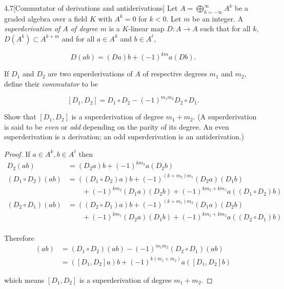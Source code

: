 \begin{problem}{4.7}[Commutator of derivations and antiderivations]
Let \(A = \bigoplus_{k=-\infty}^{\infty} A^{k}\) be a graded algebra over a field \(K\) with \(A^{k} = 0\) for \(k < 0\). Let \(m\) be an integer. A \textit{superderivation of \(A\) of degree \(m\)} is a \(K\)-linear map \(D\colon A \to A\) such that for all \(k\), \(D(A^{k}) \subset A^{k+m}\) and for all \(a \in A^{k}\) and \(b \in A^{\ell}\),

\[
    D(ab) = (Da)b + {(-1)}^{km} a(Db).
\]

If \(D_{1}\) and \(D_{2}\) are two superderivations of \(A\) of respective degrees \(m_{1}\) and \(m_{2}\), define their \textit{commutator} to be

\[
    [D_{1}, D_{2}] = D_{1} \circ D_{2} - {(-1)}^{m_{1} m_{2}} D_{2} \circ D_{1}.
\]

Show that \([D_{1}, D_{2}]\) is a superderivation of degree \(m_{1} + m_{2}\). (A superderivation is said to be \textit{even} or \textit{odd} depending on the parity of its degree. An even superderivation is a derivation; an odd superderivation is an antiderivation.)
\end{problem}

\begin{proof}
    If \( a \in A^{k}, b \in A^{\ell} \) then
    \begingroup
    \allowdisplaybreaks%
    \begin{align*}
        D_{2}(ab)               & = (D_{2}a)b + {(-1)}^{km_{2}}a(D_{2}b)                                                      \\
        (D_{1} \circ D_{2})(ab) & = ((D_{1} \circ D_{2})a)b + {(-1)}^{(k + m_{2})m_{1}} (D_{2}a)(D_{1}b)                      \\
                                & \qquad + {(-1)}^{km_{2}}(D_{1}a)(D_{2}b) + {(-1)}^{km_{2} + km_{1}} a((D_{1} \circ D_{2})b) \\
        (D_{2} \circ D_{1})(ab) & = ((D_{2} \circ D_{1})a)b + {(-1)}^{(k + m_{1})m_{2}}(D_{1}a)(D_{2}b)                       \\
                                & \qquad + {(-1)}^{km_{1}}(D_{2}a)(D_{1}b) + {(-1)}^{km_{1} + km_{2}} a((D_{2} \circ D_{1})b) \\
    \end{align*}
    \endgroup

    Therefore
    \begingroup
    \allowdisplaybreaks%
    \begin{align*}
        [D_{1}, D_{2}](ab) & = (D_{1} \circ D_{2})(ab) - {(-1)}^{m_{1}m_{2}} (D_{2} \circ D_{1})(ab) \\
                           & = {([D_{1}, D_{2}]a)b} + {(-1)}^{k(m_{1} + m_{2})} a{([D_{1}, D_{2}]b)}
    \end{align*}
    \endgroup

    which means \( [D_{1}, D_{2}] \) is a superderivation of degree \( m_{1} + m_{2} \).
\end{proof}
